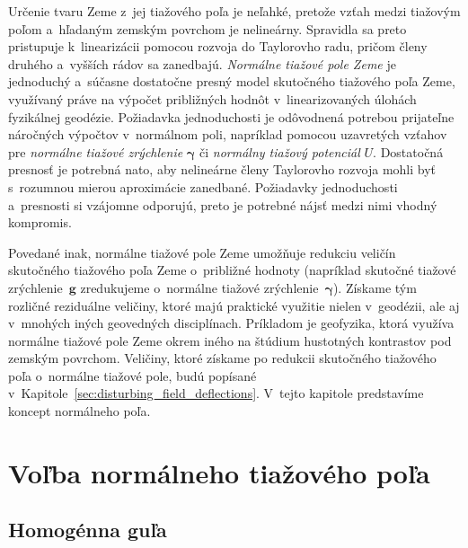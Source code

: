 \documentclass[a4paper, 12pt]{book}
\let\vec\mathbf
\begin{document}
Určenie tvaru Zeme z~jej tiažového poľa je neľahké, pretože vzťah medzi 
tiažovým poľom a~hľadaným zemským povrchom je nelineárny.  Spravidla sa preto 
pristupuje k~linearizácii pomocou rozvoja do Taylorovho radu, pričom členy 
druhého a~vyšších rádov sa zanedbajú.  \emph{Normálne tiažové pole Zeme} je 
jednoduchý a~súčasne dostatočne presný model skutočného tiažového poľa Zeme, 
využívaný práve na výpočet približných hodnôt v~linearizovaných úlohách 
fyzikálnej geodézie.  Požiadavka jednoduchosti je odôvodnená potrebou 
prijateľne náročných výpočtov v~normálnom poli, napríklad pomocou uzavretých 
vzťahov pre \emph{normálne tiažové zrýchlenie} $\boldsymbol{\gamma}$ či 
\emph{normálny tiažový potenciál} $U$.  Dostatočná presnosť je potrebná nato, 
aby nelineárne členy Taylorovho rozvoja mohli byť s~rozumnou mierou aproximácie 
zanedbané.  Požiadavky jednoduchosti a~presnosti si vzájomne odporujú, preto je 
potrebné nájsť medzi nimi vhodný kompromis.

Povedané inak, normálne tiažové pole Zeme umožňuje redukciu veličín skutočného 
tiažového poľa Zeme o~približné hodnoty (napríklad skutočné tiažové 
zrýchlenie~$\vec g$ zredukujeme o~normálne tiažové 
zrýchlenie~$\boldsymbol{\gamma}$).  Získame tým rozličné reziduálne veličiny, 
ktoré majú praktické využitie nielen v~geodézii, ale aj v~mnohých iných 
geovedných disciplínach.  Príkladom je geofyzika, ktorá využíva normálne 
tiažové pole Zeme okrem iného na štúdium hustotných kontrastov pod zemským 
povrchom.  Veličiny, ktoré získame po redukcii skutočného tiažového poľa 
o~normálne tiažové pole, budú popísané 
v~Kapitole~\ref{sec:disturbing_field_deflections}.  V~tejto kapitole 
predstavíme koncept normálneho poľa.

\section{Voľba normálneho tiažového poľa}
\label{sec:choice_of_normal_gravity_field}

\subsection{Homogénna guľa}
\label{sec:normal_field_ball}
\end{document}
